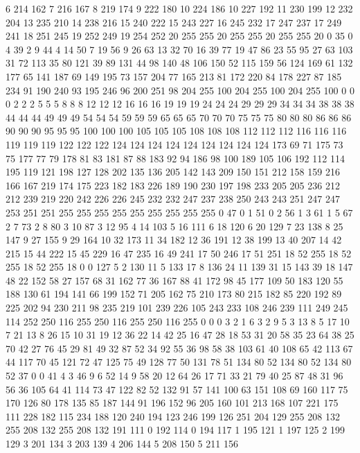 6 214 162 7 216 167 8 219 174 9 222 180 10 224 186 10 227 192 11 230 199 12 232 204 13 235 210 14 238 216 15 240 222 15 243 227 16 245 232 17 247 237 17 249 241 18 251 245 19 252 249 19 254 252 20 255 255 20 255 255 20 255 255 20 0 35 0 4 39 2 9 44 4 14 50 7 19 56 9 26 63 13 32 70 16 39 77 19 47 86 23 55 95 27 63 103 31 72 113 35 80 121 39 89 131 44 98 140 48 106 150 52 115 159 56 124 169 61 132 177 65 141 187 69 149 195 73 157 204 77 165 213 81 172 220 84 178 227 87 185 234 91 190 240 93 195 246 96 200 251 98 204 255 100 204 255 100 204 255 100 0 0 0 2 2 2 5 5 5 8 8 8 12 12 12 16 16 16 19 19 19 24 24 24 29 29 29 34 34 34 38 38 38 44 44 44 49 49 49 54 54 54 59 59 59 65 65 65 70 70 70 75 75 75 80 80 80 86 86 86 90 90 90 95 95 95 100 100 100 105 105 105 108 108 108 112 112 112 116 116 116 119 119 119 122 122 122 124 124 124 124 124 124 124 124 124 
173 69 71 175 73 75 177 77 79 178 81 83 181 87 88 183 92 94 186 98 100 189 105 106 192 112 114 195 119 121 198 127 128 202 135 136 205 142 143 209 150 151 212 158 159 216 166 167 219 174 175 223 182 183 226 189 190 230 197 198 233 205 205 236 212 212 239 219 220 242 226 226 245 232 232 247 237 238 250 243 243 251 247 247 253 251 251 255 255 255 255 255 255 255 255 255 0 47 0 1 51 0 2 56 1 3 61 1 5 67 2 7 73 2 8 80 3 10 87 3 12 95 4 14 103 5 16 111 6 18 120 6 20 129 7 23 138 8 25 147 9 27 155 9 29 164 10 32 173 11 34 182 12 36 191 12 38 199 13 40 207 14 42 215 15 44 222 15 45 229 16 47 235 16 49 241 17 50 246 17 51 251 18 52 255 18 52 255 18 52 255 18 0 0 127 5 2 130 11 5 133 17 8 136 24 11 139 31 15 143 39 18 147 48 22 152 58 27 157 68 31 162 77 36 167 88 41 172 98 45 177 109 50 183 120 55 188 130 61 194 141 66 199 152 71 205 162 75 210 173 80 215 182 85 220 192 
89 225 202 94 230 211 98 235 219 101 239 226 105 243 233 108 246 239 111 249 245 114 252 250 116 255 250 116 255 250 116 255 0 0 0 3 2 1 6 3 2 9 5 3 13 8 5 17 10 7 21 13 8 26 15 10 31 19 12 36 22 14 42 25 16 47 28 18 53 31 20 58 35 23 64 38 25 70 42 27 76 45 29 81 49 32 87 52 34 92 55 36 98 58 38 103 61 40 108 65 42 113 67 44 117 70 45 121 72 47 125 75 49 128 77 50 131 78 51 134 80 52 134 80 52 134 80 52 37 0 0 41 4 3 46 9 6 52 14 9 58 20 12 64 26 17 71 33 21 79 40 25 87 48 31 96 56 36 105 64 41 114 73 47 122 82 52 132 91 57 141 100 63 151 108 69 160 117 75 170 126 80 178 135 85 187 144 91 196 152 96 205 160 101 213 168 107 221 175 111 228 182 115 234 188 120 240 194 123 246 199 126 251 204 129 255 208 132 255 208 132 255 208 132 191 111 0 192 114 0 194 117 1 195 121 1 197 125 2 199 129 3 201 134 3 203 139 4 206 144 5 208 150 5 211 156 
